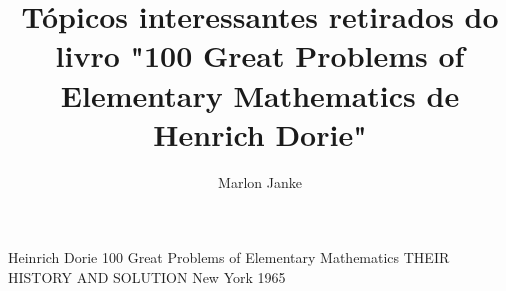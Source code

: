 \documentclass[11pt]{book}
\title{Tópicos interessantes retirados do livro "100 Great Problems of Elementary Mathematics de Henrich Dorie"}
\author{Marlon Janke}
\begin{document}
\maketitle 					 %
\tableofcontents  			 %
\listoffigures				 %

\begin{thebibliography}{1}
	 Heinrich Dorie
		100 Great Problems of Elementary Mathematics
		THEIR HISTORY AND SOLUTION
		New York 1965

\end{thebibliography}
\end{document}
